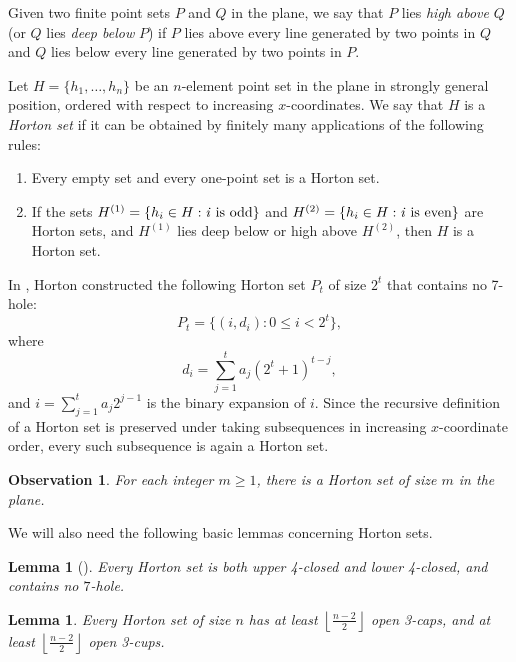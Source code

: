 \documentclass[11pt]{article}
\theoremstyle{plain}
\newtheorem{lemma}[theorem]{Lemma}
\newtheorem{observation}[theorem]{Observation}
\theoremstyle{definition}
\theoremstyle{remark}
\begin{document}
Given two finite point sets $P$ and $Q$ in the plane, we say that $P$ lies \emph{high above} $Q$ (or $Q$ lies \emph{deep below} $P$) if $P$ lies above every line generated by two points in $Q$ and $Q$ lies below every line generated by two points in $P$. 


 

Let $H=\{h_1,\ldots,h_n\}$ be an $n$-element point set in the plane in strongly general position, ordered with respect to increasing $x$-coordinates. We say that $H$ is a \emph{Horton set} if it can be obtained by finitely many applications of the following rules:
\begin{enumerate}
    \item Every empty set and every one-point set is a Horton set.
    \item If the sets $H^{(1)}=\{h_i\in H:\textnormal{\emph{i} is odd}\}$ and $H^{(2)}=\{h_i\in H:\textnormal{\emph{i} is even}\}$ are Horton sets, and $H^{(1)}$ lies deep below or high above $H^{(2)}$, then $H$ is a Horton set.
\end{enumerate}

\noindent In \cite{H}, Horton constructed the following Horton set $P_t$ of size $2^t$ that contains no 7-hole:
\[
P_t=\{(i,d_i):0\le i<2^t\},
\]
where
\[
d_i=\sum_{j=1}^t a_j(2^t+1)^{t-j},
\]
and $i=\sum_{j=1}^t a_j2^{j-1}$ is the binary expansion of $i$. Since the recursive definition of a Horton set is preserved under taking subsequences in increasing \(x\)-coordinate order, every such subsequence is again a Horton set.

\begin{observation}
For each integer $m\ge1$, there is a Horton set of size $m$ in the plane.
\end{observation}

We will also need the following basic lemmas concerning Horton sets.

\begin{lemma}[\cite{H}]
Every Horton set is both upper 4-closed and lower 4-closed, and contains no $7$-hole. 
\end{lemma}

\begin{lemma}\label{lem:3cap}
Every Horton set of size $n$ has at least $\left\lfloor \frac{n-2}{2}\right\rfloor$ open 3-caps, and at least $\left\lfloor \frac{n-2}{2}\right\rfloor$ open 3-cups.
\end{lemma}
\end{document}
